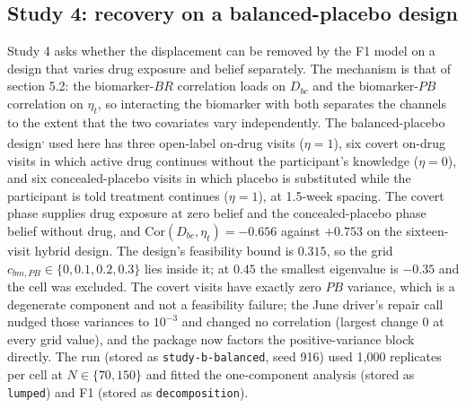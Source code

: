\documentclass[
  11pt,
]{article}
\begin{document}
\subsection{Study 4: recovery on a balanced-placebo design}\label{study-4-recovery-on-a-balanced-placebo-design}

Study 4 asks whether the displacement can be removed by the F1 model on a
design that varies drug exposure and belief separately. The mechanism is
that of section 5.2: the biomarker-\(BR\) correlation loads on \(D_{bc}\) and
the biomarker-\(PB\) correlation on \(\eta_t\), so interacting the biomarker
with both separates the channels to the extent that the two covariates
vary independently. The balanced-placebo design\textsuperscript{,} used here has three open-label on-drug visits (\(\eta = 1\)),
six covert on-drug visits in which active drug continues without the
participant's knowledge (\(\eta = 0\)), and six concealed-placebo visits in
which placebo is substituted while the participant is told treatment
continues (\(\eta = 1\)), at 1.5-week spacing. The covert phase supplies
drug exposure at zero belief and the concealed-placebo phase belief
without drug, and \(\mathrm{Cor}(D_{bc}, \eta_t) = -0.656\) against \(+0.753\)
on the sixteen-visit hybrid design. The design's feasibility bound is
\(0.315\), so the grid \(c_{bm,PB} \in \{0, 0.1, 0.2,
0.3\}\) lies inside it; at \(0.45\) the smallest eigenvalue is
\(-0.35\) and the cell was
excluded. The covert visits have exactly zero \(PB\) variance, which is a
degenerate component and not a feasibility failure; the June driver's
repair call nudged those variances to \(10^{-3}\) and changed no
correlation (largest change \(0\) at every grid value), and the package now
factors the positive-variance block directly. The run (stored as
\texttt{study-b-balanced}, seed 916) used 1,000 replicates per cell at
\(N \in \{70, 150\}\) and fitted the one-component
analysis (stored as \texttt{lumped}) and F1 (stored as
\texttt{decomposition}).
\end{document}
